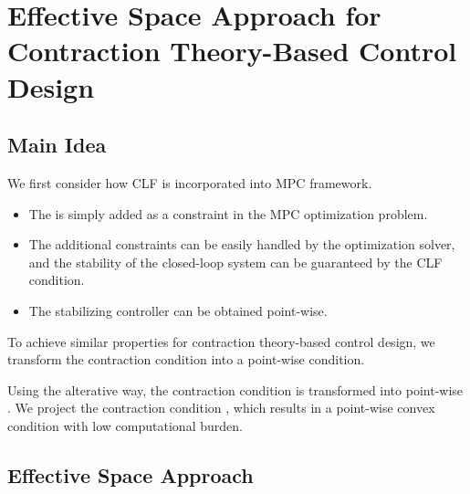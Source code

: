 \section{Effective Space Approach for Contraction Theory-Based Control Design}

\subsection{Main Idea}

\begin{frame}{\insertsubsectionhead}{}

    We first consider how CLF is incorporated into MPC framework.

    \begin{itemize}
        \item The  is simply added as a constraint in the MPC optimization problem.
        \item The additional constraints can be easily handled by the optimization solver, and the stability of the closed-loop system can be guaranteed by the CLF condition.
        \item The stabilizing controller can be obtained point-wise.
    \end{itemize}

    \hfill

    To achieve similar properties for contraction theory-based control design, we transform the contraction condition into a point-wise condition.

    Using the alterative way, the contraction condition is transformed into point-wise .
    We project the contraction condition , which results in a point-wise convex condition with low computational burden.

\end{frame}

\subsection{Effective Space Approach}

